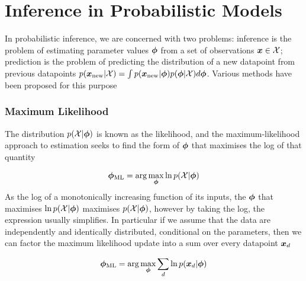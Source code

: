 

\newcommand \qfam { { \mathcal{Q} } }
\newcommand \xdat { { \mathcal{X} } }
\newcommand \zdat { { \mathcal{Z} } }
\newcommand \xnew { { \vv{x}_{\text{new}} } }
\newcommand \znew { { \vv{z}_{\text{new}} } }
\newcommand \param { { \vv{\phi} } }
\newcommand \ml[1] { { {#1}_{\text{ML}} } } 
\newcommand \map[1] { { {#1}_{\text{MAP}} } } 
\newcommand \quarter { { \oneover{4} } }
\newcommand \eighth { { \oneover{8} } }
\newcommand \fqt[1] { { \mathcal{F}\left( {#1} \right) } }
\newcommand \joint { { p(\xdat, \zdat | \param) } }
\newcommand \logjoint { { \ln \joint } }
\newcommand \exlogjoint[1] { { \ex{\logjoint}{{#1}} } }

\section{Inference in Probabilistic Models}
In probabilistic inference, we are concerned with two problems: inference is the problem of estimating parameter values $\param$ from a set of observations $\vv{x} \in \xdat$; prediction is the problem of predicting the distribution of a new datapoint from previous datapoints $p(\xnew | \xdat) = \int p(\xnew | \param) p(\param | \xdat) d\param$. Various methods have been proposed for this purpose

\subsubsection*{Maximum Likelihood}
The distribution $p(\xdat|\param)$ is known as the likelihood, and the maximum-likelihood approach to estimation seeks to find the form of $\param$ that maximises the log of that quantity

\begin{align*}
\ml{\param} = \arg \max_{\param} \ln p(\xdat | \param)
\end{align*}
As the log of a monotonically increasing function of its inputs, the $\param$ that maximises $\ln p(\xdat | \param)$ maximises $p(\xdat | \param)$, however by taking the log, the expression usually simplifies. In particular if we assume that the data are independently and identically distributed, conditional on the parameters, then we can factor the maximum likelihood update into a sum over every datapoint ${ \bm x_d }$

\begin{align*}
\ml{\param} = \arg \max_{\param} \sum_d \ln p(\xd | \param)
\end{align*}

